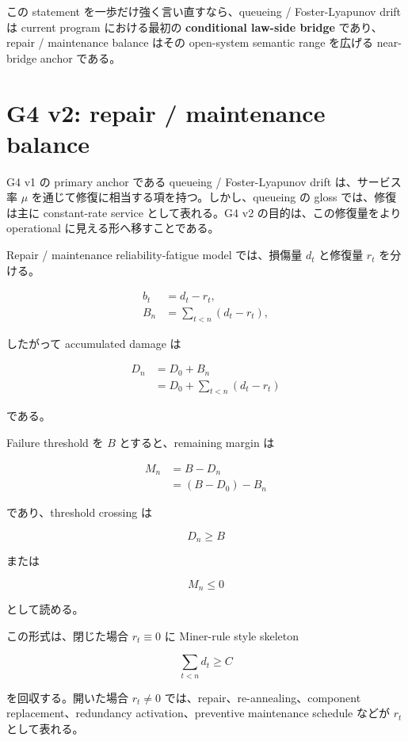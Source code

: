 \documentclass[12pt,a4paper]{article}
\begin{document}
この statement を一歩だけ強く言い直すなら、queueing / Foster-Lyapunov drift は current program における最初の \textbf{conditional law-side bridge} であり、repair / maintenance balance はその open-system semantic range を広げる near-bridge anchor である。

\section{G4 v2: repair / maintenance balance}\label{g4-v2-repair-maintenance-balance}

G4 v1 の primary anchor である queueing / Foster-Lyapunov drift は、サービス率 \(\mu\) を通じて修復に相当する項を持つ。しかし、queueing の gloss では、修復は主に constant-rate service として表れる。G4 v2 の目的は、この修復量をより operational に見える形へ移すことである。

Repair / maintenance reliability-fatigue model では、損傷量 \(d_{t}\) と修復量 \(r_{t}\) を分ける。

\[
\begin{aligned}
b_{t}&=d_{t}-r_{t},\qquad \\
B_{n}&=\sum_{t<n}(d_{t}-r_{t}),
\end{aligned}
\]

したがって accumulated damage は

\[
\begin{aligned}
D_{n} &= D_0 + B_{n} \\
&= D_0 + \sum_{t<n}(d_{t}-r_{t})
\end{aligned}
\]

である。

Failure threshold を \(B\) とすると、remaining margin は

\[
\begin{aligned}
M_{n} &= B-D_{n} \\
&= (B-D_0)-B_{n}
\end{aligned}
\]

であり、threshold crossing は

\[
D_{n} \ge B
\]

または

\[
M_{n} \le 0
\]

として読める。

この形式は、閉じた場合 \(r_{t}\equiv 0\) に Miner-rule style skeleton

\[
\sum_{t<n} d_{t} \ge C
\]

を回収する。開いた場合 \(r_{t}\neq 0\) では、repair、re-annealing、component replacement、redundancy activation、preventive maintenance schedule などが \(r_{t}\) として表れる。
\end{document}
